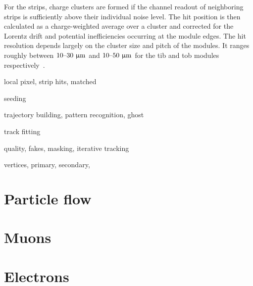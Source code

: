 For the strips, charge clusters are formed if the channel readout of neighboring strips is sufficiently above their individual noise level. The hit position is then calculated as a charge-weighted average over a cluster and corrected for the Lorentz drift and potential inefficiencies occurring at the module edges. The hit resolution depends largely on the cluster size and pitch of the modules. It ranges roughly between $10\text{--}30~\upmu\mathrm{m}$ and $10\text{--}50~\upmu\mathrm{m}$ for the \gls{tib} and \gls{tob} modules respectively~\cite{Chatrchyan:2014fea}.


local pixel, strip hits, matched

seeding

trajectory building, pattern recognition, ghost

track fitting

quality, fakes, masking, iterative tracking

vertices, primary, secondary, 



\section{Particle flow}

\section{Muons}

\section{Electrons}

